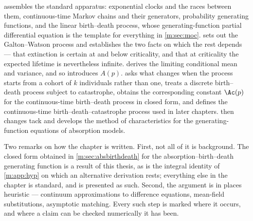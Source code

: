  assembles the standard apparatus: exponential clocks and the
races between them, continuous-time Markov chains and their generators,
probability generating functions, and the linear birth--death process, whose
generating-function partial differential equation is the template for everything in
\cref{m:sec:moc}.  sets out the Galton--Watson process and
establishes the two facts on which the rest depends --- that extinction is certain
at and below criticality, and that at criticality the expected lifetime is
nevertheless infinite.  derives the limiting conditional mean and
variance, and so introduces $A(p)$.  asks what changes when the
process starts from a cohort of $k$ individuals rather than one, treats a discrete
birth--death process subject to catastrophe, obtains the corresponding constant
$\Ac(p)$ for the continuous-time birth--death process in closed form, and defines
the continuous-time birth--death--catastrophe process used in later chapters.
 then changes tack and develops the method of characteristics for
the generating-function equations of absorption models.

Two remarks on how the chapter is written. First, not all of it is background. The
closed form obtained in \cref{m:sec:absbirthdeath} for the
absorption--birth--death generating function is a result of this thesis, as is the
integral identity of \cref{m:app:hyp} on which an alternative derivation rests;
everything else in the chapter is standard, and is presented as such. Second, the
argument is in places heuristic --- continuum approximations to difference
equations, mean-field substitutions, asymptotic matching. Every such step is marked
where it occurs, and where a claim can be checked numerically it has been.

